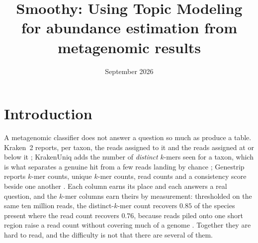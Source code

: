 \documentclass[pdflatex,sn-vancouver-num]{sn-jnl}
\begin{document}
    \title{Smoothy: Using Topic Modeling for abundance estimation from metagenomic results}

    \author*[1]{ }


    \date{September 2026}



    \maketitle

    \section{Introduction}\label{introduction}
    A metagenomic classifier does not answer a question so much as produce a table. Kraken~2 reports,
    per taxon, the reads assigned to it and the reads assigned at or below it \citep{kraken2};
    KrakenUniq adds the number of \emph{distinct} $k$-mers seen for a taxon, which is what separates a
    genuine hit from a few reads landing by chance \citep{krakenuniq}; Genestrip reports $k$-mer
    counts, unique $k$-mer counts, read counts and a consistency score beside one another
    \citep{genestrip-pub}. Each column earns its place and each answers a real question, and the
    $k$-mer columns earn theirs by measurement: thresholded on the same ten million reads, the
    distinct-$k$-mer count recovers $0.85$ of the species present where the read count recovers
    $0.76$, because reads piled onto one short region raise a read count without covering much of a
    genome \citep{krakenuniq}. Together they
    are hard to read, and the difficulty is not that there are several of them.
\end{document}
